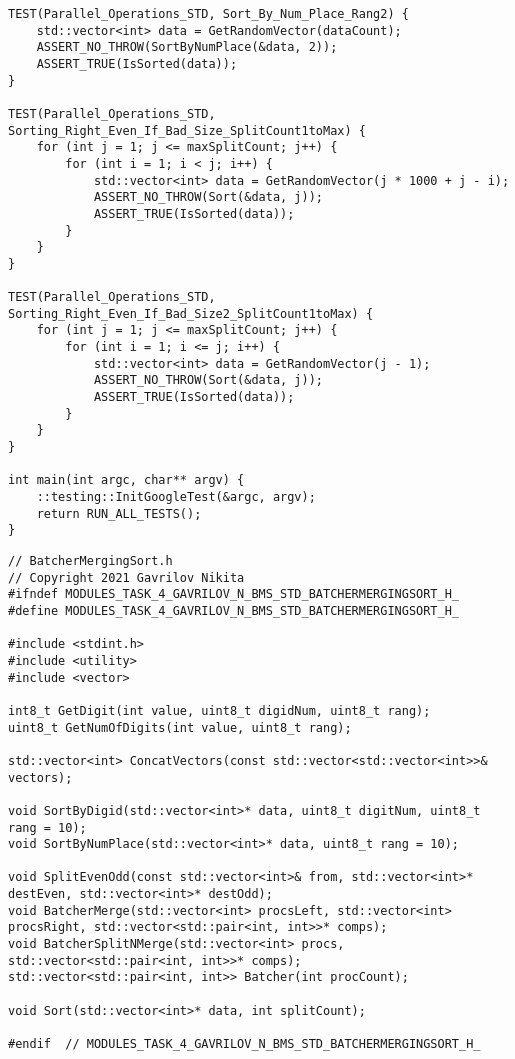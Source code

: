 \documentclass{report}
\begin{document}
\begin{lstlisting}
TEST(Parallel_Operations_STD, Sort_By_Num_Place_Rang2) {
    std::vector<int> data = GetRandomVector(dataCount);
    ASSERT_NO_THROW(SortByNumPlace(&data, 2));
    ASSERT_TRUE(IsSorted(data));
}

TEST(Parallel_Operations_STD, Sorting_Right_Even_If_Bad_Size_SplitCount1toMax) {
    for (int j = 1; j <= maxSplitCount; j++) {
        for (int i = 1; i < j; i++) {
            std::vector<int> data = GetRandomVector(j * 1000 + j - i);
            ASSERT_NO_THROW(Sort(&data, j));
            ASSERT_TRUE(IsSorted(data));
        }
    }
}

TEST(Parallel_Operations_STD, Sorting_Right_Even_If_Bad_Size2_SplitCount1toMax) {
    for (int j = 1; j <= maxSplitCount; j++) {
        for (int i = 1; i <= j; i++) {
            std::vector<int> data = GetRandomVector(j - 1);
            ASSERT_NO_THROW(Sort(&data, j));
            ASSERT_TRUE(IsSorted(data));
        }
    }
}

int main(int argc, char** argv) {
    ::testing::InitGoogleTest(&argc, argv);
    return RUN_ALL_TESTS();
}
\end{lstlisting}
\begin{lstlisting}
// BatcherMergingSort.h
// Copyright 2021 Gavrilov Nikita
#ifndef MODULES_TASK_4_GAVRILOV_N_BMS_STD_BATCHERMERGINGSORT_H_
#define MODULES_TASK_4_GAVRILOV_N_BMS_STD_BATCHERMERGINGSORT_H_

#include <stdint.h>
#include <utility>
#include <vector>

int8_t GetDigit(int value, uint8_t digidNum, uint8_t rang);
uint8_t GetNumOfDigits(int value, uint8_t rang);

std::vector<int> ConcatVectors(const std::vector<std::vector<int>>& vectors);

void SortByDigid(std::vector<int>* data, uint8_t digitNum, uint8_t rang = 10);
void SortByNumPlace(std::vector<int>* data, uint8_t rang = 10);

void SplitEvenOdd(const std::vector<int>& from, std::vector<int>* destEven, std::vector<int>* destOdd);
void BatcherMerge(std::vector<int> procsLeft, std::vector<int> procsRight, std::vector<std::pair<int, int>>* comps);
void BatcherSplitNMerge(std::vector<int> procs, std::vector<std::pair<int, int>>* comps);
std::vector<std::pair<int, int>> Batcher(int procCount);

void Sort(std::vector<int>* data, int splitCount);

#endif  // MODULES_TASK_4_GAVRILOV_N_BMS_STD_BATCHERMERGINGSORT_H_
\end{lstlisting}
\end{document}
